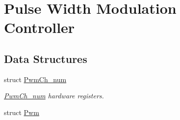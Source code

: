\hypertarget{group__SAMS70__PWM}{}\section{Pulse Width Modulation Controller}
\label{group__SAMS70__PWM}
\subsection*{Data Structures}
\begin{DoxyCompactItemize}
\item 
struct \mbox{\hyperlink{structPwmCh__num}{Pwm\+Ch\+\_\+num}}
\begin{DoxyCompactList}\small\item\em \mbox{\hyperlink{structPwmCh__num}{Pwm\+Ch\+\_\+num}} hardware registers. \end{DoxyCompactList}\item 
struct \mbox{\hyperlink{structPwm}{Pwm}}
\end{DoxyCompactItemize}
